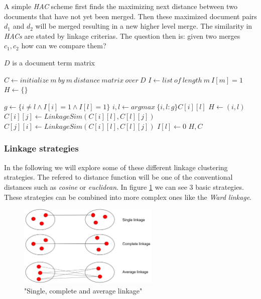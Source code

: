     A simple \emph{HAC} scheme first finds the maximizing next distance between two documents that have not yet been merged. Then these maximized document pairs $d_1$ and $d_2$ will be merged resulting in a new higher level merge. The similarity in \emph{HACs} are stated by linkage criterias. The question then is: given two merges $c_1,c_2$ how can we compare them?

    \begin{algorithm}[H]
    \begin{algorithmic}[1]
      \caption{$D$ is a document term matrix}\label{hac}
        \State $C \gets initialize\:m\:by\:m\:distance\:matrix\:over\:D$
        \State $I \gets list\:of\:length\:m\:I[m]=1$ 
        \State $H \gets \{\}$ 

          \State $g \gets \{i\not=l \wedge I[i]=1 \wedge I[l]=1 \}$
          \State $i,l \gets  argmax\:\{ i,l : g\} C[i][l]$ 
          \State $H \gets (i,l)$ 
           
            \State $C[i][j] \gets LinkageSim(C[i][l], C[l][j])$
            \State $C[j][i] \gets LinkageSim(C[i][l], C[l][j])$
          \EndFor
          \State $I[l] \gets 0$ 
        \EndFor
        \State \Return $H, C$
      \EndFunction
    \end{algorithmic}
    \end{algorithm}

    \subsubsection{Linkage strategies}
    \label{sec:linkages}

    In the following we will explore some of these different linkage clustering strategies.
    The refered to distance function will be one of the conventional distances such as \emph{cosine} or \emph{euclidean}. In figure \ref{linkage_strategy} we can see 3 basic strategies. These strategies can be combined into more complex ones like the \emph{Ward linkage}.

      \begin{figure}[h!]
        \centering
          \includegraphics[width=0.6\textwidth]{linkage_strategy.png}
          \caption{"Single, complete and average linkage"}
          \label{linkage_strategy}
      \end{figure}


